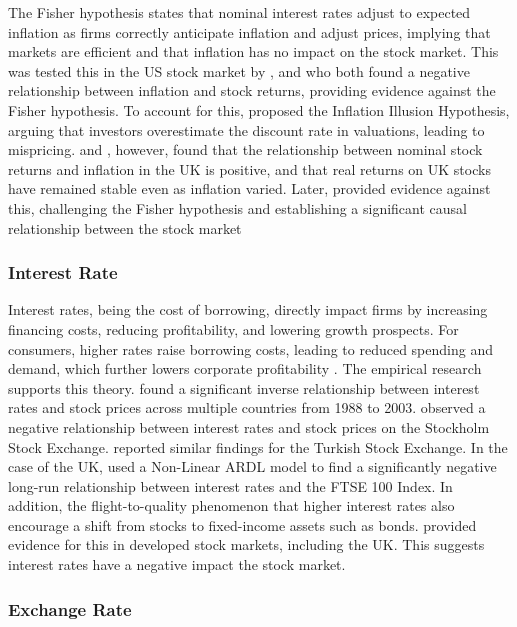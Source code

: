 \documentclass[11pt,a4paper]{article}
\newcommand{\citeboth}[1]{\citeauthor{#1} \citep{#1}}
\begin{document}
The Fisher hypothesis states that nominal interest rates adjust to expected 
inflation as firms correctly anticipate inflation 
and adjust prices, implying that markets are efficient and that inflation has no impact on the stock market. This was tested this in the US stock market by \citeboth{jaffe1976}, and
\citeboth{bodie1976} who both found a negative relationship between inflation and stock returns, providing evidence against the Fisher hypothesis.
To account for this,
\citeboth{mogdiliani1979} proposed the Inflation Illusion Hypothesis, 
arguing that investors overestimate the discount rate in valuations, leading to mispricing. 
\citeboth{gultekin1983} and \citeboth{firth1979}, however, found that the relationship between nominal stock returns and inflation in the UK is positive, and that real returns on UK stocks have remained stable even as inflation varied.
Later, \citeboth{hasan2008} provided evidence against this, challenging the Fisher hypothesis and establishing a 
significant causal relationship between the stock market 


\subsubsection{Interest Rate}

Interest rates, being the cost of borrowing, directly impact firms by increasing financing costs, reducing profitability, and lowering growth prospects. For consumers, higher rates raise borrowing costs, leading to reduced spending and demand, which further lowers corporate profitability \citep{boe199section}. 
The empirical research supports this theory. \citeboth{alam2009} found a significant inverse relationship between interest rates and stock prices across multiple countries from 1988 to 2003.
\citeboth{talla2013} observed a negative relationship between interest rates and stock prices on the Stockholm Stock Exchange.
\citeboth{demir2019} reported similar findings for the Turkish Stock Exchange. In the case of the UK, \citeboth{neifar2023} used a Non-Linear ARDL model to find a significantly negative long-run relationship between interest rates and the FTSE 100 Index. 
In addition, the flight-to-quality phenomenon that higher interest rates also encourage a shift from stocks to fixed-income 
assets such as bonds. \citeboth{asgharian2016} provided evidence for this in developed stock markets, including the UK. This suggests interest rates 
have a negative impact the stock market.

\subsubsection{Exchange Rate}
\end{document}

